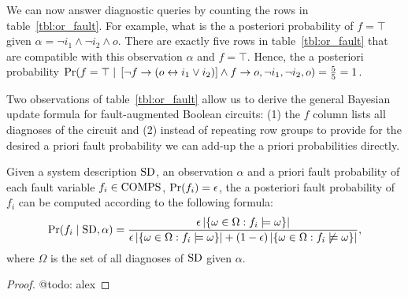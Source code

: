 \documentclass{article}
\begin{document}
\par
%
We can now answer diagnostic queries by counting the rows in
table~\ref{tbl:or_fault}. For example, what is the a posteriori
probability of $f = \top$ given $\alpha = \neg{i_1} \wedge \neg{i_2}
\wedge o$. There are exactly five rows in table~\ref{tbl:or_fault}
that are compatible with this observation $\alpha$ and $f =
\top$. Hence, the a posteriori probability $\mbox{Pr}(f = \top \;|\;
  \left[\neg{f} \rightarrow \left(o \leftrightarrow i_1 \vee
    i_2\right)\right] \wedge f \rightarrow o, \neg{i_1}, \neg{i_2}, o)
= \frac{5}{5} = 1$.
\par
Two observations of table~\ref{tbl:or_fault} allow us to derive the
general Bayesian update formula for fault-augmented Boolean circuits:
(1) the $f$ column lists all diagnoses of the circuit and (2) instead
of repeating row groups to provide for the desired a priori fault
probability we can add-up the a priori probabilities directly.
%
\begin{theorem}
  Given a system description $\mathrm{SD}$, an observation $\alpha$ and a
  priori fault probability of each fault variable $f_i \in \mathrm{COMPS}$,
  $\mbox{Pr}(f_i) = \epsilon$, the a posteriori fault probability of $f_i$
  can be computed according to the following formula:
  \[
  \mbox{Pr}(f_i \;|\; \mathrm{SD}, \alpha) = \frac{\epsilon\left|\left\{\omega \in \Omega : f_i \models \omega\right\}\right|}
                                     {\epsilon\left|\left\{\omega \in \Omega : f_i \models \omega\right\}\right| + \left(1 - \epsilon\right)\left|\left\{\omega \in \Omega : f_i \not\models \omega\right\}\right|},
  \]
  where $\Omega$ is the set of all diagnoses of $\mathrm{SD}$ given $\alpha$.
\end{theorem}
\begin{proof}
  @todo: alex
\end{proof}
\end{document}
